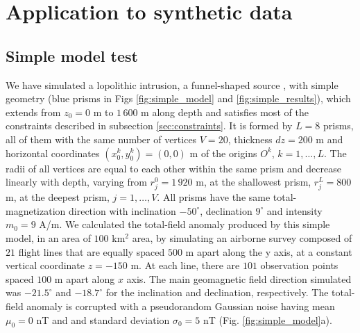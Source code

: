 \section{Application to synthetic data}\label{sec:synthetic}

\subsection{Simple model test}

We have simulated a lopolithic intrusion, a funnel-shaped source \cite[]{cawthorn-2018}, with simple geometry (blue prisms in Figs \ref{fig:simple_model} and \ref{fig:simple_results}), which extends from $z_0=0$ m to $1\,600$ m along depth and satisfies most of the constraints described in subsection \ref{sec:constraints}. It is formed by $L=8$ prisms, all of them with the same number of vertices $ V = 20 $, thickness $ dz = 200 $ m and horizontal coordinates $ (x_0^k, y_0^k) = (0, 0) $ m of the origins $O^k$, $k=1,\dots,L$. The radii of all vertices are equal to each other within the same prism and decrease linearly with depth, varying from $r_j^0=1\,920$ m, at the shallowest prism, $r_j^L=800$ m, at the deepest prism, $j=1,\dots, V$. All prisms have the same total-magnetization direction with inclination $ -50^\circ $, declination $ 9^\circ $ and intensity $ m_0 = 9 $ A/m. We calculated the total-field anomaly produced by this simple model, in an area of $ 100 $ km$^2$ area, by simulating an airborne survey composed of $ 21 $ flight lines that are equally spaced $ 500 $ m apart along the y axis, at a constant vertical coordinate $ z = -150 $ m. At each line, there are $ 101 $ observation points spaced $100$ m apart along $ x $ axis. 
The main geomagnetic field direction simulated was $ -21.5^\circ $ and $ -18.7^\circ $ for the inclination and declination, respectively. 
The total-field anomaly is corrupted with a pseudorandom Gaussian noise having mean $ \mu_0=0 $ nT and and standard deviation $ \sigma_0 = 5 $ nT (Fig. \ref{fig:simple_model}a).


